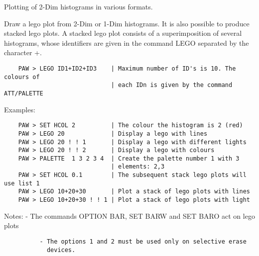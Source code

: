 \ENDCBIG
{}
\ifMENUtext
   \par
Plotting of 2-Dim histograms in various formats.  


\fi


\BEGARG
{}
\ENDARG
{}
\ENDOPT

   \par
Draw a lego plot from 2-Dim or 1-Dim histograms.  It is also possible to 
   produce stacked lego plots. A stacked lego plot consists of a 
   superimposition of several histograms, whose identifiers are given in the 
   command LEGO separated by the character \DQUOTE{}+\DQUOTE{}.  
\begin{verbatim}
    PAW > LEGO ID1+ID2+ID3    | Maximum number of ID's is 10. The colours of
                              | each IDn is given by the command ATT/PALETTE
\end{verbatim}
   \par
Examples:  
\begin{verbatim}
    PAW > SET HCOL 2          | The colour the histogram is 2 (red)
    PAW > LEGO 20             | Display a lego with lines
    PAW > LEGO 20 ! ! 1       | Display a lego with different lights
    PAW > LEGO 20 ! ! 2       | Display a lego with colours
    PAW > PALETTE  1 3 2 3 4  | Create the palette number 1 with 3
                              | elements: 2,3
    PAW > SET HCOL 0.1        | The subsequent stack lego plots will use list 1
    PAW > LEGO 10+20+30       | Plot a stack of lego plots with lines
    PAW > LEGO 10+20+30 ! ! 1 | Plot a stack of lego plots with light
\end{verbatim}
   \par
Notes: - The commands OPTION BAR, SET BARW and SET BARO act on lego plots 
\begin{verbatim}
          - The options 1 and 2 must be used only on selective erase
            devices.
\end{verbatim}

